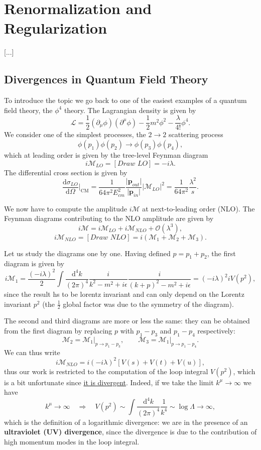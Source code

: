 \chapter[Renormalization and Regularization]{Renormalization and \\Regularization}

 [...]

\section{Divergences in Quantum Field Theory}

To introduce the topic we go back to one of the easiest examples of a quantum field theory, the $\phi^4$ theory. The Lagrangian density is given by
\[
    \mathcal{L} = \frac{1}{2} (\partial_\mu \phi)(\partial^\mu \phi) - \frac{1}{2} m^2 \phi^2 - \frac{\lambda}{4!} \phi^4.
\]
We consider one of the simplest processes, the $2 \to 2$ scattering process
\[
    \phi(p_1)\phi(p_2) \to \phi(p_3)\phi(p_4),
\]
which at leading order is given by the tree-level Feynman diagram
\[
    i \mathcal{M}_{LO}  = [\textit{Draw LO}] = -i \lambda.
\]
The differential cross section is given by
\[
    \frac{\mathrm{d} \sigma_{LO}}{\mathrm{d} \Omega}\big|_{\text{CM}} = \frac{1}{64 \pi^2 E^2_{cm}} \frac{\vert \mathbf{p}_{out} \vert}{\vert \mathbf{p}_{in} \vert} \vert \mathcal{M}_{LO} \vert^2 = \frac{1}{64 \pi^2} \frac{\lambda^2}{s}.
\]

We now have to compute the amplitude \(i \mathcal{M} \) at next-to-leading order (NLO). The Feynman diagrams contributing to the NLO amplitude are given by
\[
    i \mathcal{M} = i \mathcal{M}_{LO} + i \mathcal{M}_{NLO} + \mathcal{O}(\lambda^3),
\]
\[
    i \mathcal{M}_{NLO} = [\textit{Draw NLO}] = i (\mathcal{M}_1 + \mathcal{M}_2 + \mathcal{M}_3).
\]

Let us study the diagrams one by one. Having defined \(p = p_1 + p_2\), the first diagram is given by
\[
    i \mathcal{M}_1 = \frac{(-i \lambda)^2}{2} \int \frac{\mathrm{d}^4 k}{(2\pi)^4} \frac{i}{k^2 - m^2 + i\epsilon} \frac{i}{(k+p)^2 - m^2 + i \epsilon} = (-i \lambda)^2 i V(p^2),
\]
since the result hs to be lorentz invariant and can only depend on the Lorentz invariant \(p^2\) (the \(\tfrac{1}{2}\) global factor was due to the symmetry of the diagram).

The second and third diagrams are more or less the same: they can be obtained from the first diagram by replacing \(p\) with \(p_1 - p_3\) and \(p_1 - p_4\) respectively:
\[
    \mathcal{M}_2 = \mathcal{M}_1 \big|_{p \to p_1 - p_3}, \qquad \mathcal{M}_3 = \mathcal{M}_1 \big|_{p \to p_1 - p_4}.
\]
We can thus write
\[
    i \mathcal{M}_{NLO} = i (-i \lambda)^2 [V(s) + V(t) + V(u)],
\]
thus our work is restricted to the computation of the loop integral \(V(p^2)\), which is a bit unfortunate since \uline{it is divergent}. Indeed, if we take the limit \(k^{\mu}  \to \infty\) we have
\[
    k^{\mu} \to \infty \quad \Rightarrow \quad V(p^2) \sim \int \frac{\mathrm{d}^4 k}{(2\pi)^4} \frac{1}{k^4} \sim \log \Lambda \to \infty,
\]
which is the definition of a logarithmic divergence: we are in the presence of an \textbf{ultraviolet (UV) divergence}, since the divergence is due to the contribution of high momentum modes in the loop integral.

